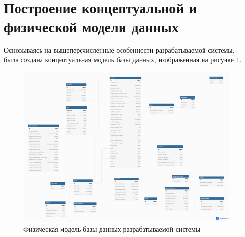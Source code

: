 \documentclass[../nirs.tex]{subfiles}
\begin{document}
\section{Построение концептуальной и физической модели данных}
Основываясь на вышеперечисленные особенности разрабатываемой системы, была
создана концептуальная модель базы данных, изображенная на рисунке
\ref{fig:3_1_db_conceptual}.

\begin{figure}[H]
	\centering
	\includegraphics[keepaspectratio,width=\textwidth]{./images/3_1_db_conceptual.png}
	\caption{Физическая модель базы данных разрабатываемой системы}
	\label{fig:3_1_db_conceptual}
\end{figure}
\end{document}
